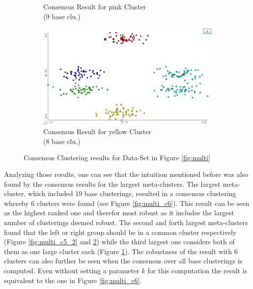 \documentclass[
	a4paper,
	english,
	twoside,
	openright,               
	11pt                            
	]{report}
\begin{document}
\begin{figure}[h]
\begin{subfigure}[t]{.49\textwidth}
  \caption{Consensus Result for pink Cluster\\(9 base clu.)}
  \label{fig:multi_c4}
\end{subfigure}
\hfill
\begin{subfigure}[t]{.49\textwidth}
  \centering
  \includegraphics[width=.95\linewidth]{multi_c5_1}
  \caption{Consensus Result for yellow Cluster\\(8 base clu.)}
  \label{fig:multi_c5_1}
\end{subfigure}

\caption{Consensus Clustering results for Data-Set in Figure \ref{fig:multi}}
\label{fig:multi_consres}
\end{figure}

Analyzing those results, one can see that the intuition mentioned before was also found by the consensus results for the largest meta-clusters. The largest meta-cluster, which included 19 base clusterings, resulted in a consensus clustering whereby $6$ clusters were found (see Figure \ref{fig:multi_c6}). This result can be seen as the highest ranked one and therefor most robust as it includes the largest number of clusterings deemed robust. The second and forth largest meta-clusters found that the left or right group should be in a common cluster respectively (Figure \ref{fig:multi_c5_2} and \ref{fig:multi_c5_1}) while the third largest one considers both of them as one large cluster each (Figure \ref{fig:multi_c4}). The robustness of the result with $6$ clusters can also further be seen when the consensus over all base clusterings is computed. Even without setting a parameter $k$ for this computation the result is equivalent to the one in Figure \ref{fig:multi_c6}.
\end{document}
